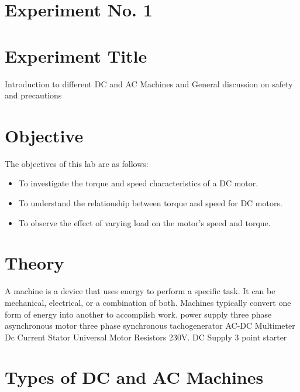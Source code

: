 \documentclass[a4paper,12pt]{article}
\begin{document}
	\section{Experiment No. 1}
	
	\section{Experiment Title }
	
    Introduction to different DC and AC Machines and General discussion on safety and precautions

	\section{Objective}
	
	The objectives of this lab are as follows:
	\begin{itemize}
		\item To investigate the torque and speed characteristics of a DC motor.
		\item To understand the relationship between torque and speed for DC motors.
		\item To observe the effect of varying load on the motor's speed and torque.
	\end{itemize}
	
	\section{Theory}
	A machine is a device that uses energy to perform a specific task. It can be mechanical, electrical, or a combination of both. Machines typically convert one form of energy into another to accomplish work.
	power supply
	three phase asynchronous motor
	three phase synchronous
	tachogenerator
	AC-DC Multimeter
	Dc Current Stator
	Universal Motor
	Resistors
	230V. DC Supply
	3 point starter
	
	\section{Types of DC and AC Machines}
	
\end{document}

